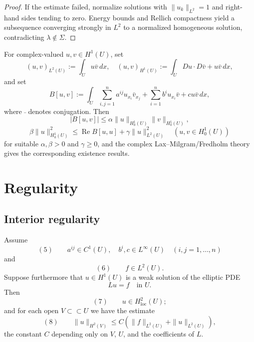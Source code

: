 \begin{proof}
\sketch If the estimate failed, normalize solutions with $\|u_k\|_{L^2}=1$ and right-hand sides tending to zero. Energy bounds and Rellich compactness yield a subsequence converging strongly in $L^2$ to a normalized homogeneous solution, contradicting $\lambda\notin\Sigma$.
\end{proof}

\begin{remark}
\label{rem:complex-valued-weak-solutions}
For complex-valued $u,v\in H^1(U)$, set
$$(u,v)_{L^2(U)} := \int_U u\bar v\,dx, \quad (u,v)_{H^1(U)} := \int_U Du \cdot D\bar v + u\bar v\,dx,$$
and set
$$B[u,v] := \int_U \sum_{i,j=1}^n a^{ij}u_{x_i}\bar v_{x_j} + \sum_{i=1}^n b^iu_{x_i}\bar v + cu\bar v\,dx,$$
where $\bar{\ }$ denotes conjugation. Then
$$|B[u,v]| \leq \alpha\|u\|_{H_0^1(U)}\|v\|_{H_0^1(U)},$$
$$\beta\|u\|_{H_0^1(U)}^2 \leq \operatorname{Re}B[u,u] + \gamma\|u\|_{L^2(U)}^2 \quad (u,v \in H_0^1(U))$$
for suitable $\alpha,\beta>0$ and $\gamma\ge0$, and the complex Lax--Milgram/Fredholm theory gives the corresponding existence results.
\end{remark}

\section{Regularity}
\label{sec:elliptic-regularity}

\subsection{Interior regularity}

\begin{theorem}
\label{thm:interior-h2-regularity}
Assume
$$(5) \qquad a^{ij} \in C^1(U), \quad b^i,c \in L^\infty(U) \quad (i,j=1,\ldots,n)$$
and
$$(6) \qquad f \in L^2(U).$$
Suppose furthermore that $u \in H^1(U)$ is a weak solution of the elliptic PDE
$$Lu = f \quad \text{in } U.$$
Then
$$(7) \qquad u \in H^2_{\text{loc}}(U);$$
and for each open $V \subset\subset U$ we have the estimate
$$(8) \qquad \|u\|_{H^2(V)} \leq C\left(\|f\|_{L^2(U)} + \|u\|_{L^2(U)}\right),$$
the constant $C$ depending only on $V$, $U$, and the coefficients of $L$.
\end{theorem}

